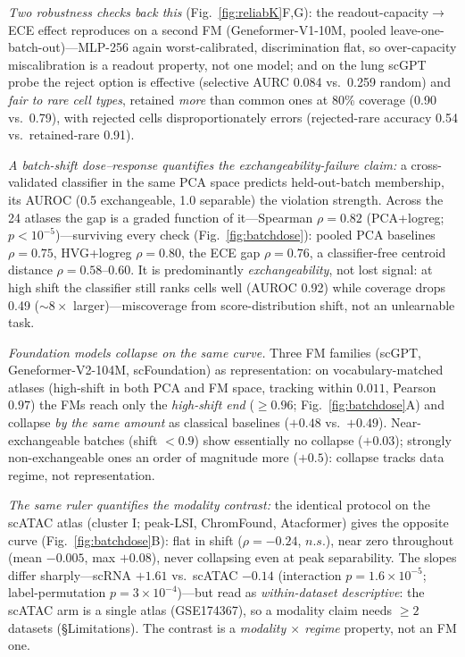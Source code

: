 \documentclass[journal]{IEEEtran}
\begin{document}
\emph{Two robustness checks back this} (Fig.~\ref{fig:reliabK}F,G): the readout-capacity$\to$ECE effect reproduces on a second FM (Geneformer-V1-10M, pooled leave-one-batch-out)---MLP-256 again worst-calibrated, discrimination flat, so over-capacity miscalibration is a readout property, not one model; and on the lung scGPT probe the reject option is effective (selective AURC 0.084 vs.\ 0.259 random) and \emph{fair to rare cell types}, retained \emph{more} than common ones at 80\% coverage (0.90 vs.\ 0.79), with rejected cells disproportionately errors (rejected-rare accuracy 0.54 vs.\ retained-rare 0.91).

\emph{A batch-shift dose--response quantifies the exchangeability-failure claim:} a cross-validated classifier in the same PCA space predicts held-out-batch membership, its AUROC (0.5 exchangeable, 1.0 separable) the violation strength. Across the 24 atlases the gap is a graded function of it---Spearman $\rho=0.82$ (PCA+logreg; $p<10^{-5}$)---surviving every check (Fig.~\ref{fig:batchdose}): pooled PCA baselines $\rho=0.75$, HVG+logreg $\rho=0.80$, the ECE gap $\rho=0.76$, a classifier-free centroid distance $\rho=0.58$--$0.60$. It is predominantly \emph{exchangeability}, not lost signal: at high shift the classifier still ranks cells well (AUROC 0.92) while coverage drops 0.49 (${\sim}8\times$ larger)---miscoverage from score-distribution shift, not an unlearnable task.

\emph{Foundation models collapse on the same curve.} Three FM families (scGPT, Geneformer-V2-104M, scFoundation) as representation: on vocabulary-matched atlases (high-shift in both PCA and FM space, tracking within $0.011$, Pearson $0.97$) the FMs reach only the \emph{high-shift end} ($\ge 0.96$; Fig.~\ref{fig:batchdose}A) and collapse \emph{by the same amount} as classical baselines ($+0.48$ vs.\ $+0.49$). Near-exchangeable batches (shift $<0.9$) show essentially no collapse ($+0.03$); strongly non-exchangeable ones an order of magnitude more ($+0.5$): collapse tracks data regime, not representation.

\emph{The same ruler quantifies the modality contrast:} the identical protocol on the scATAC atlas (cluster I; peak-LSI, ChromFound, Atacformer) gives the opposite curve (Fig.~\ref{fig:batchdose}B): flat in shift ($\rho=-0.24$, $n.s.$), near zero throughout (mean $-0.005$, max $+0.08$), never collapsing even at peak separability. The slopes differ sharply---scRNA $+1.61$ vs.\ scATAC $-0.14$ (interaction $p=1.6\times10^{-5}$; label-permutation $p=3\times10^{-4}$)---but read as \emph{within-dataset descriptive}: the scATAC arm is a single atlas (GSE174367), so a modality claim needs $\geq2$ datasets (\S Limitations). The contrast is a \emph{modality $\times$ regime} property, not an FM one.
\end{document}
